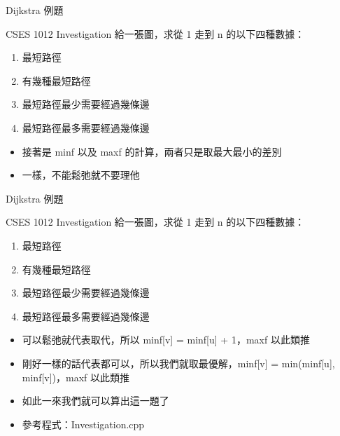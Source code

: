 \documentclass[aspectratio=169]{beamer}
\begin{document}
    \begin{frame}{Dijkstra 例題}
        \begin{block}{CSES 1012 Investigation}
            給一張圖，求從 1 走到 n 的以下四種數據：
            \begin{enumerate}
                \item 最短路徑
                \item 有幾種最短路徑
                \item 最短路徑最少需要經過幾條邊
                \item 最短路徑最多需要經過幾條邊
            \end{enumerate}
        \end{block}

        \begin{itemize}
            \item<1-> 接著是 minf 以及 maxf 的計算，兩者只是取最大最小的差別
            \item<2-> 一樣，不能鬆弛就不要理他
        \end{itemize}
    \end{frame}

    \begin{frame}{Dijkstra 例題}
        \begin{block}{CSES 1012 Investigation}
            給一張圖，求從 1 走到 n 的以下四種數據：
            \begin{enumerate}
                \item 最短路徑
                \item 有幾種最短路徑
                \item 最短路徑最少需要經過幾條邊
                \item 最短路徑最多需要經過幾條邊
            \end{enumerate}
        \end{block}

        \begin{itemize}
            \item<1-> 可以鬆弛就代表取代，所以 minf[v] = minf[u] + 1，maxf 以此類推
            \item<2-> 剛好一樣的話代表都可以，所以我們就取最優解，minf[v] = min(minf[u], minf[v])，maxf 以此類推
            \item<3-> 如此一來我們就可以算出這一題了
            \item<3-> 參考程式：Investigation.cpp
        \end{itemize}
    \end{frame}
\end{document}
